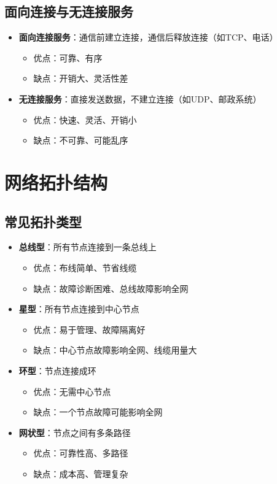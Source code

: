 \subsection{面向连接与无连接服务}
\begin{itemize}[leftmargin=2em,itemsep=0pt]
    \item \textbf{面向连接服务}：通信前建立连接，通信后释放连接（如TCP、电话）
    \begin{itemize}[itemsep=0pt]
        \item 优点：可靠、有序
        \item 缺点：开销大、灵活性差
    \end{itemize}
    \item \textbf{无连接服务}：直接发送数据，不建立连接（如UDP、邮政系统）
    \begin{itemize}[itemsep=0pt]
        \item 优点：快速、灵活、开销小
        \item 缺点：不可靠、可能乱序
    \end{itemize}
\end{itemize}

\section{网络拓扑结构}
\subsection{常见拓扑类型}
\begin{itemize}[leftmargin=2em,itemsep=0pt]
    \item \textbf{总线型}：所有节点连接到一条总线上
    \begin{itemize}[itemsep=0pt]
        \item 优点：布线简单、节省线缆
        \item 缺点：故障诊断困难、总线故障影响全网
    \end{itemize}
    \item \textbf{星型}：所有节点连接到中心节点
    \begin{itemize}[itemsep=0pt]
        \item 优点：易于管理、故障隔离好
        \item 缺点：中心节点故障影响全网、线缆用量大
    \end{itemize}
    \item \textbf{环型}：节点连接成环
    \begin{itemize}[itemsep=0pt]
        \item 优点：无需中心节点
        \item 缺点：一个节点故障可能影响全网
    \end{itemize}
    \item \textbf{网状型}：节点之间有多条路径
    \begin{itemize}[itemsep=0pt]
        \item 优点：可靠性高、多路径
        \item 缺点：成本高、管理复杂
    \end{itemize}
\end{itemize}

